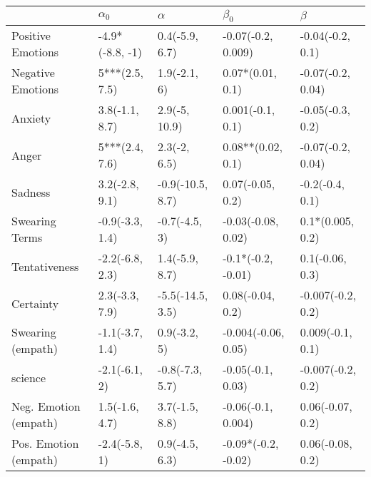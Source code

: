 \begin{tabular}{lllll}
\toprule
{} &       $\alpha_0$ &          $\alpha$ &            $\beta_0$ &            $\beta$ \\
\midrule
Positive Emotions     &  -4.9*(-8.8, -1) &    0.4(-5.9, 6.7) &   -0.07(-0.2, 0.009) &   -0.04(-0.2, 0.1) \\
Negative Emotions     &   5***(2.5, 7.5) &      1.9(-2.1, 6) &     0.07*(0.01, 0.1) &  -0.07(-0.2, 0.04) \\
Anxiety               &   3.8(-1.1, 8.7) &     2.9(-5, 10.9) &     0.001(-0.1, 0.1) &   -0.05(-0.3, 0.2) \\
Anger                 &   5***(2.4, 7.6) &      2.3(-2, 6.5) &    0.08**(0.02, 0.1) &  -0.07(-0.2, 0.04) \\
Sadness               &   3.2(-2.8, 9.1) &  -0.9(-10.5, 8.7) &     0.07(-0.05, 0.2) &    -0.2(-0.4, 0.1) \\
Swearing Terms        &  -0.9(-3.3, 1.4) &     -0.7(-4.5, 3) &   -0.03(-0.08, 0.02) &   0.1*(0.005, 0.2) \\
Tentativeness         &  -2.2(-6.8, 2.3) &    1.4(-5.9, 8.7) &   -0.1*(-0.2, -0.01) &    0.1(-0.06, 0.3) \\
Certainty             &   2.3(-3.3, 7.9) &  -5.5(-14.5, 3.5) &     0.08(-0.04, 0.2) &  -0.007(-0.2, 0.2) \\
Swearing (empath)     &  -1.1(-3.7, 1.4) &      0.9(-3.2, 5) &  -0.004(-0.06, 0.05) &   0.009(-0.1, 0.1) \\
science               &    -2.1(-6.1, 2) &   -0.8(-7.3, 5.7) &    -0.05(-0.1, 0.03) &  -0.007(-0.2, 0.2) \\
Neg. Emotion (empath) &   1.5(-1.6, 4.7) &    3.7(-1.5, 8.8) &   -0.06(-0.1, 0.004) &   0.06(-0.07, 0.2) \\
Pos. Emotion (empath) &    -2.4(-5.8, 1) &    0.9(-4.5, 6.3) &  -0.09*(-0.2, -0.02) &   0.06(-0.08, 0.2) \\
\bottomrule
\end{tabular}
